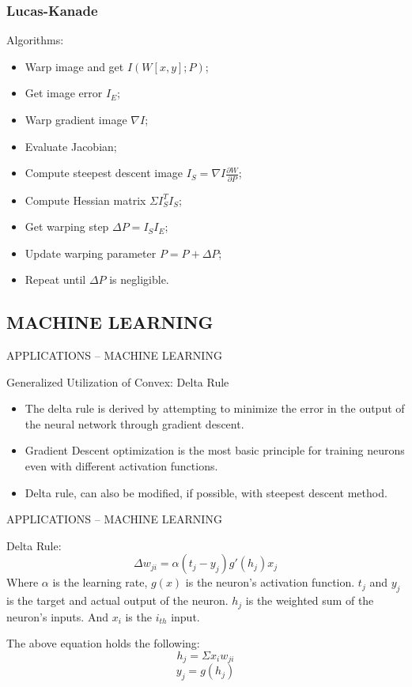\begin{frame}
\frametitle{Lucas-Kanade}
  \begin{greyblock}{Algorithms: }
    \begin{itemize}
    \item Warp image and get $I(W[x, y]; P)$;
    \item Get image error $I_E$;
    \item Warp gradient image $\nabla I$;
    \item Evaluate Jacobian;
    \item Compute steepest descent image  $I_S = \nabla I \frac{\partial W}{\partial
    P}$;
    \item Compute Hessian matrix $\Sigma I_S^TI_S$;
    \item Get warping step $\Delta P = I_SI_E$;
    \item Update warping parameter $P = P + \Delta P$;
      \item Repeat until $\Delta P$ is negligible.
    \end{itemize}
  \end{greyblock}
\end{frame}


\subsection{MACHINE LEARNING}


\begin{frame}{ \LARGE APPLICATIONS -- MACHINE LEARNING}
  \begin{blueblock}{Generalized Utilization of Convex: Delta Rule}
\begin{itemize}
\item The delta rule is derived by attempting to minimize the error in the output of the neural network through gradient descent.
\item Gradient Descent optimization is the most basic principle for
  training neurons even with different activation functions.
\item Delta rule, can also be modified, if possible, with steepest descent method.
\end{itemize}
  \end{blueblock}

\end{frame}

\begin{frame}{ \LARGE APPLICATIONS -- MACHINE LEARNING}
  \begin{redblock}{Delta Rule:}
$$\Delta w_{ji} = \alpha (t_j - y_j)g'(h_j)x_j$$
Where $\alpha$ is the learning rate, $g(x)$ is the neuron's activation
function. $t_j$ and $y_j$ is the target and actual output of the
neuron. $h_j$ is the weighted sum of the neuron's inputs. And $x_i$ is
the $i_{th}$ input.
  \end{redblock}

  \begin{greyblock}{The above equation holds the following:}
$$h_j = \Sigma x_iw_{ji}$$
$$y_j = g(h_j)$$

  \end{greyblock}

\end{frame}

